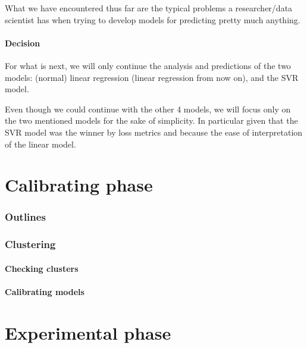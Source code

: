 \documentclass[11pt]{article}
\begin{document}
What we have encountered thus far are the typical problems a researcher/data scientist has when trying to develop models
for predicting pretty much anything.

\subsection{Decision}\label{subsec:decision}

For what is next, we will only continue the analysis and predictions of the two models: (normal) linear regression
(linear regression from now on), and the SVR model.

Even though we could continue with the other 4 models, we will focus only on the two mentioned models for the sake of
simplicity.
In particular given that the SVR model was the winner by loss metrics and because the ease of interpretation of the
linear model.



\part{Calibrating phase} \label{part:calibrating}

\section{Outlines}\label{sec:outlines}


\section{Clustering}\label{sec:clustering}

\subsection{Checking clusters}\label{subsec:checking-clusters}

\subsection{Calibrating models}\label{subsec:calibrating-models}


\part{Experimental phase} \label{part:experimenting}
\end{document}
